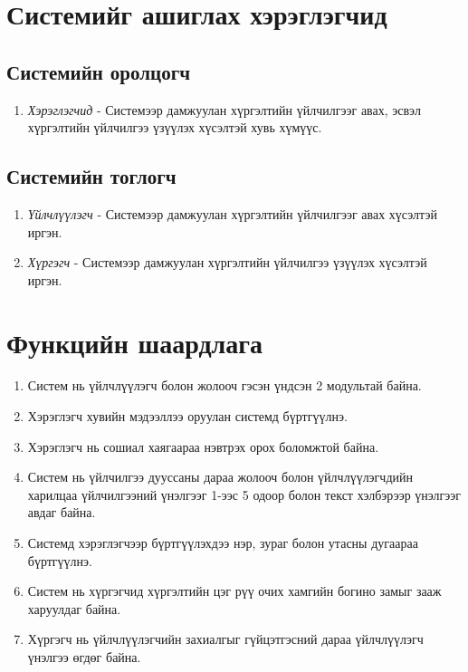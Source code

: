 \section{Системийг ашиглах хэрэглэгчид}

\subsection{Системийн оролцогч}
\begin{enumerate} 
    \item \textit{Хэрэглэгчид} - Системээр дамжуулан хүргэлтийн үйлчилгээг авах, эсвэл хүргэлтийн үйлчилгээ үзүүлэх хүсэлтэй хувь хүмүүс.
\end{enumerate}

\subsection{Системийн тоглогч}
\begin{enumerate}
    \item \textit{Үйлчлүүлэгч} - Системээр дамжуулан хүргэлтийн үйлчилгээг авах хүсэлтэй иргэн.
    \item \textit{Хүргэгч} - Системээр дамжуулан хүргэлтийн үйлчилгээ үзүүлэх хүсэлтэй иргэн.
\end{enumerate}


\section{Функцийн шаардлага}

\begin{enumerate}
    \item Систем нь үйлчлүүлэгч болон жолооч гэсэн үндсэн 2 модультай байна.
    \item Хэрэглэгч хувийн мэдээллээ оруулан системд бүртгүүлнэ.
    \item Хэрэглэгч нь сошиал хаягаараа нэвтрэх орох боломжтой байна.
    \item Систем нь үйлчилгээ дууссаны дараа жолооч болон үйлчлүүлэгчдийн харилцаа үйлчилгээний үнэлгээг 1-ээс 5 одоор болон текст хэлбэрээр үнэлгээг авдаг байна.
    \item Системд хэрэглэгчээр бүртгүүлэхдээ нэр, зураг болон утасны дугаараа бүртгүүлнэ.
    \item Систем нь хүргэгчид хүргэлтийн цэг рүү очих хамгийн богино замыг зааж харуулдаг байна.
    \item Хүргэгч нь үйлчлүүлэгчийн захиалгыг гүйцэтгэсний дараа үйлчлүүлэгч үнэлгээ өгдөг байна.
\end{enumerate}

